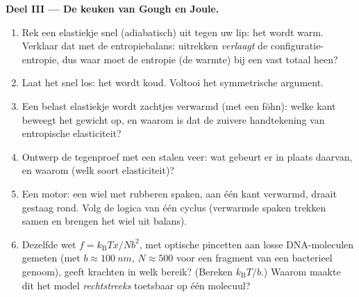 \begin{problem}
\medskip\noindent\textbf{Deel III --- De keuken van Gough en Joule.}
\begin{enumerate}[resume]
  \item Rek een elastiekje snel (adiabatisch) uit tegen uw lip: het wordt
        warm. Verklaar dat met de entropiebalans: uitrekken \emph{verlaagt}
        de configuratie-entropie, dus waar moet de entropie (de warmte)
        bij een vast totaal heen?
  \item Laat het snel los: het wordt koud. Voltooi het symmetrische
        argument.
  \item Een belast elastiekje wordt zachtjes verwarmd (met een föhn):
        welke kant beweegt het gewicht op, en waarom is dat de zuivere
        handtekening van entropische elasticiteit?
  \item Ontwerp de tegenproef met een stalen veer: wat gebeurt er in
        plaats daarvan, en waarom (welk soort elasticiteit)?
  \item Een motor: een wiel met rubberen spaken, aan één kant verwarmd,
        draait gestaag rond. Volg de logica van één cyclus (verwarmde
        spaken trekken samen en brengen het wiel uit balans).
  \item Dezelfde wet $f = k_{\text{B}}Tx/Nb^2$, met optische pincetten aan
        losse DNA-moleculen gemeten (met $b \approx
        \qty{100}{nm}$, $N \approx 500$ voor een fragment van een bacterieel genoom), geeft
        krachten in welk bereik? (Bereken $k_{\text{B}}T/b$.) Waarom maakte
        dit het model \emph{rechtstreeks} toetsbaar op één molecuul?
\end{enumerate}


\end{problem}
